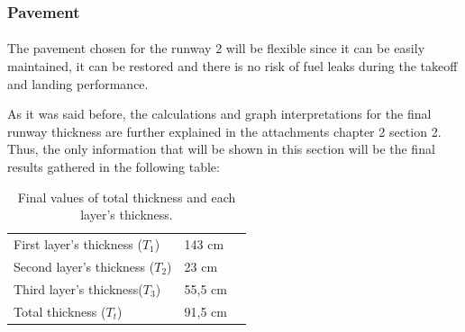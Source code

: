 		\subsubsection{Pavement}
		\paragraph{}The pavement chosen for the runway 2 will be flexible since it can be easily maintained, it can be restored and there is no risk of fuel leaks during the takeoff and landing performance.

		As it was said before, the calculations and graph interpretations for the final runway thickness are further explained in the attachments chapter 2 section 2. Thus, the only information that will be shown in this section will be the final results gathered in the following table:
	
		\begin{table}[htb]
			\centering
			\begin{tabular}{ll p{5cm}}
				\midrule[2pt]
				First layer's thickness (\(T_1\))& 143 cm\\
				Second layer's thickness (\(T_2\)) & 23 cm\\
				Third layer's thickness(\(T_3\))& 55,5 cm \\
				Total thickness (\(T_t\))& 91,5 cm\\
				\bottomrule[2pt]
			\end{tabular}
			\caption{Final values of total thickness and each layer's thickness.}
			\label{}
		\end{table}
		
		